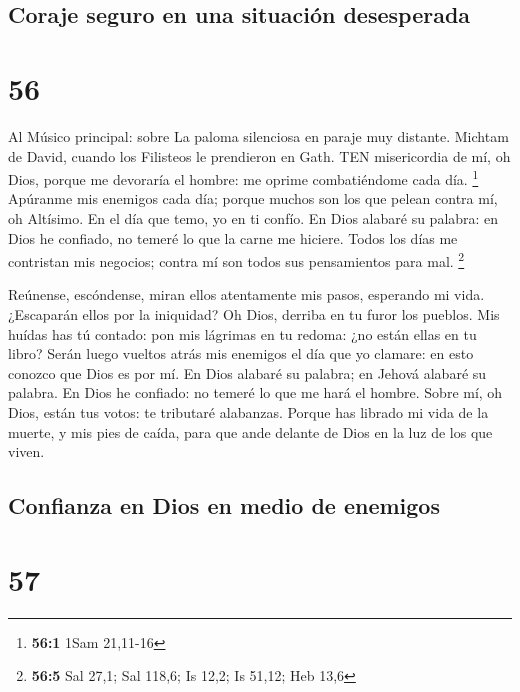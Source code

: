 \hypertarget{coraje-seguro-en-una-situaciuxf3n-desesperada}{%
\subsection{Coraje seguro en una situación
desesperada}\label{coraje-seguro-en-una-situaciuxf3n-desesperada}}

\hypertarget{section-55}{%
\section{56}\label{section-55}}

 Al Músico principal: sobre La paloma silenciosa en paraje
muy distante. Michtam de David, cuando los Filisteos le prendieron en
Gath. TEN misericordia de mí, oh Dios, porque me devoraría el hombre: me
oprime combatiéndome cada día. \footnote{\textbf{56:1} 1Sam 21,11-16}
 Apúranme mis enemigos cada día; porque muchos son los que
pelean contra mí, oh Altísimo.  En el día que temo, yo en ti
confío.  En Dios alabaré su palabra: en Dios he confiado, no
temeré lo que la carne me hiciere.  Todos los días me
contristan mis negocios; contra mí son todos sus pensamientos para mal.
\footnote{\textbf{56:5} Sal 27,1; Sal 118,6; Is 12,2; Is 51,12; Heb 13,6}

 Reúnense, escóndense, miran ellos atentamente mis pasos,
esperando mi vida.  ¿Escaparán ellos por la iniquidad? Oh
Dios, derriba en tu furor los pueblos.  Mis huídas has tú
contado: pon mis lágrimas en tu redoma: ¿no están ellas en tu libro?
 Serán luego vueltos atrás mis enemigos el día que yo
clamare: en esto conozco que Dios es por mí.  En Dios
alabaré su palabra; en Jehová alabaré su palabra.  En Dios
he confiado: no temeré lo que me hará el hombre.  Sobre mí,
oh Dios, están tus votos: te tributaré alabanzas.  Porque
has librado mi vida de la muerte, y mis pies de caída, para que ande
delante de Dios en la luz de los que viven.

\hypertarget{confianza-en-dios-en-medio-de-enemigos}{%
\subsection{Confianza en Dios en medio de
enemigos}\label{confianza-en-dios-en-medio-de-enemigos}}

\hypertarget{section-56}{%
\section{57}\label{section-56}}

